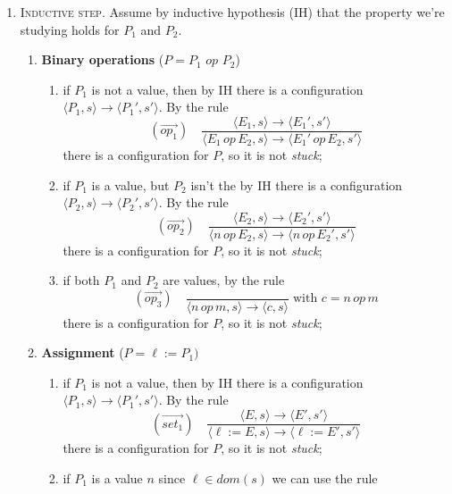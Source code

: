 \begin{solution}
\begin{enumerate}
\begin{enumerate}
\begin{enumerate}
            there is a transition. Since a such a configuration exists, $\langle !\ell, s\rangle$ is not stuck.
        \end{enumerate}
        \item \textsc{Inductive step}. Assume by inductive hypothesis (IH) that the property we're studying holds for $P_1$ and $P_2$.
            \begin{enumerate}
                \item \textbf{Binary operations} ($P=P_1$ $op$ $P_2$)
                \begin{enumerate}
                    \item if $P_1$ is not a value, then by IH there is a configuration $\langle P_1,s\rangle \to \langle P_1', s'\rangle$. By the rule 
                    \[ (\overset{\rightarrow}{op_1}) \quad \frac{\langle E_1,s\rangle \to \langle E_1', s'\rangle}{\langle E_1 \, op \, E_2,s\rangle \to \langle E_1' \,op\, E_2, s'\rangle}\]
                    there is a configuration for $P$, so it is not \textit{stuck};
                    \item if $P_1$ is a value, but $P_2$ isn't the by IH there is a configuration $\langle P_2,s\rangle \to \langle P_2', s'\rangle$. By the rule 
                    \[ (\overset{\rightarrow}{op_2}) \quad \frac{\langle E_2,s\rangle \to \langle E_2', s'\rangle}{\langle n \, op \, E_2,s\rangle \to \langle n \,op\, E_2', s'\rangle}\]
                    there is a configuration for $P$, so it is not \textit{stuck};
                    \item if both $P_1$ and $P_2$ are values, by the rule 
                    \[ (\overset{\rightarrow}{op_3}) \quad \frac{}{\langle n \, op \, m,s\rangle \to \langle c, s\rangle} \; \text{with } c = n \, op \, m\]
                    there is a configuration for $P$, so it is not \textit{stuck};
                \end{enumerate}
                \item \textbf{Assignment} ($P=\ell :=P_1)$
                \begin{enumerate}
                    \item if $P_1$ is not a value, then by IH there is a configuration $\langle P_1,s\rangle \to \langle P_1', s'\rangle$. By the rule 
                    \[ (\overset{\rightarrow}{set_1}) \quad \frac{\langle E,s\rangle \to \langle E', s'\rangle}{\langle \ell:=E,s\rangle \to \langle \ell:=E', s'\rangle}\]
                    there is a configuration for $P$, so it is not \textit{stuck};
                    \item if $P_1$ is a value $n$ since $\ell \in dom(s)$ we can use the rule 

\end{enumerate}
\end{enumerate}
\end{enumerate}
\end{enumerate}
\end{solution}
